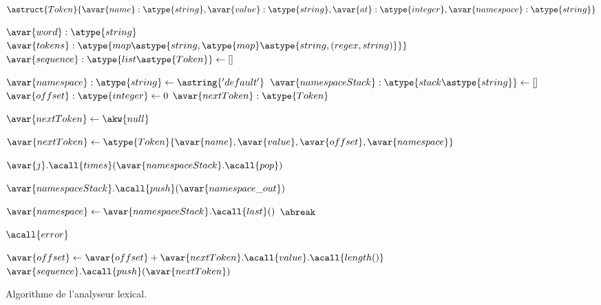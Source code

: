 \begin{figure}

\begin{algorithmic}[1]

\State $\astruct{Token}\{
    \avar{name}: \atype{string},
    \avar{value}: \atype{string},
    \avar{at}: \atype{integer},
    \avar{namespace}: \atype{string}
\}$


  \Require $\avar{word}: \atype{string}$
  \Require $\avar{tokens}: \atype{map\astype{string, \atype{map}\astype{string, (regex, string)}}}$
  \Ensure  $\avar{sequence}: \atype{list\astype{Token}} \gets []$

  \State $\avar{namespace}: \atype{string} \gets \astring{'default'}$
  \State $\avar{namespaceStack}: \atype{stack\astype{string}} \gets []$
  \State $\avar{offset}: \atype{integer} \gets 0$
  \State $\avar{nextToken}: \atype{Token}$


      \State $\avar{nextToken} \gets \akw{null}$



              \State $\avar{nextToken} \gets \atype{Token}\{\avar{name}, \avar{value}, \avar{offset}, \avar{namespace}\}$


                  \State $\avar{j}.\acall{times}(\avar{namespaceStack}.\acall{pop})$

              \Else

                  \State $\avar{namespaceStack}.\acall{push}(\avar{namespace\_out})$

              \EndIf

              \State $\avar{namespace} \gets \avar{namespaceStack}.\acall{last}()$
              \State $\abreak$

          \EndIf

      \EndFor


        \State $\acall{error}$

      \EndIf

      \State $\avar{offset} \gets \avar{offset} + \avar{nextToken}.\acall{value}.\acall{length()}$
      \State $\avar{sequence}.\acall{push}(\avar{nextToken})$

  \EndWhile

\EndFunction

\end{algorithmic}

\caption{\label{figure:data:algo_lexer} Algorithme de l'analyseur lexical.}

\end{figure}

